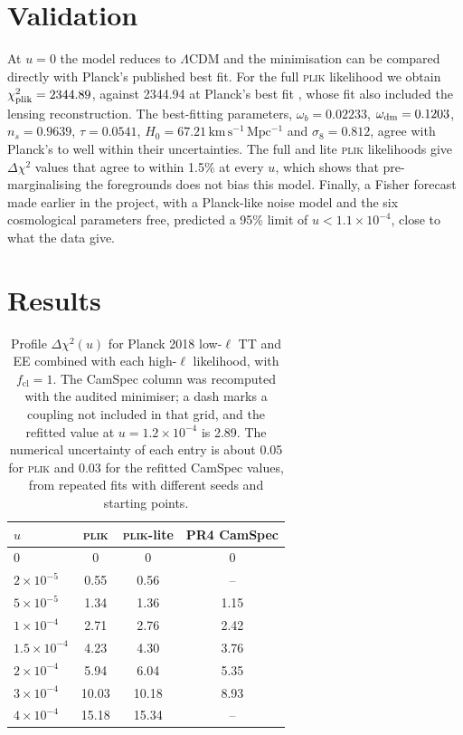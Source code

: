 \documentclass[11pt,a4paper]{article}
\newcommand{\cl}{\mathrm{cl}}
\newcommand{\dchi}{\Delta\chi^2}
\begin{document}
\section{Validation}
\label{sec:validation}

At $u=0$ the model reduces to $\Lambda$CDM and the minimisation can be compared directly with Planck's published best fit. For the full \textsc{plik} likelihood we obtain $\chi^2_{\rm plik} = 2344.89$, against 2344.94 at Planck's best fit \citep{Planck2018VI}, whose fit also included the lensing reconstruction. The best-fitting parameters, $\omega_b = 0.02233$, $\omega_{\rm dm} = 0.1203$, $n_s = 0.9639$, $\tau = 0.0541$, $H_0 = 67.21\,\mathrm{km\,s^{-1}\,Mpc^{-1}}$ and $\sigma_8 = 0.812$, agree with Planck's to well within their uncertainties. The full and lite \textsc{plik} likelihoods give $\dchi$ values that agree to within 1.5\% at every $u$, which shows that pre-marginalising the foregrounds does not bias this model. Finally, a Fisher forecast made earlier in the project, with a Planck-like noise model and the six cosmological parameters free, predicted a 95\% limit of $u < 1.1\times10^{-4}$, close to what the data give.

\section{Results}
\label{sec:results}

\begin{table}[t]
\centering
\caption{Profile $\dchi(u)$ for Planck 2018 low-$\ell$ TT and EE combined with each high-$\ell$ likelihood, with $f_\cl = 1$. The CamSpec column was recomputed with the audited minimiser; a dash marks a coupling not included in that grid, and the refitted value at $u=1.2\times10^{-4}$ is 2.89. The numerical uncertainty of each entry is about 0.05 for \textsc{plik} and 0.03 for the refitted CamSpec values, from repeated fits with different seeds and starting points.}
\label{tab:profile}
\begin{tabular}{lccc}
\toprule
$u$ & \textsc{plik} & \textsc{plik}-lite & PR4 CamSpec \\
\midrule
0 & 0 & 0 & 0 \\
$2\times10^{-5}$ & 0.55 & 0.56 & -- \\
$5\times10^{-5}$ & 1.34 & 1.36 & 1.15 \\
$1\times10^{-4}$ & 2.71 & 2.76 & 2.42 \\
$1.5\times10^{-4}$ & 4.23 & 4.30 & 3.76 \\
$2\times10^{-4}$ & 5.94 & 6.04 & 5.35 \\
$3\times10^{-4}$ & 10.03 & 10.18 & 8.93 \\
$4\times10^{-4}$ & 15.18 & 15.34 & -- \\
\bottomrule
\end{tabular}
\end{table}
\end{document}
